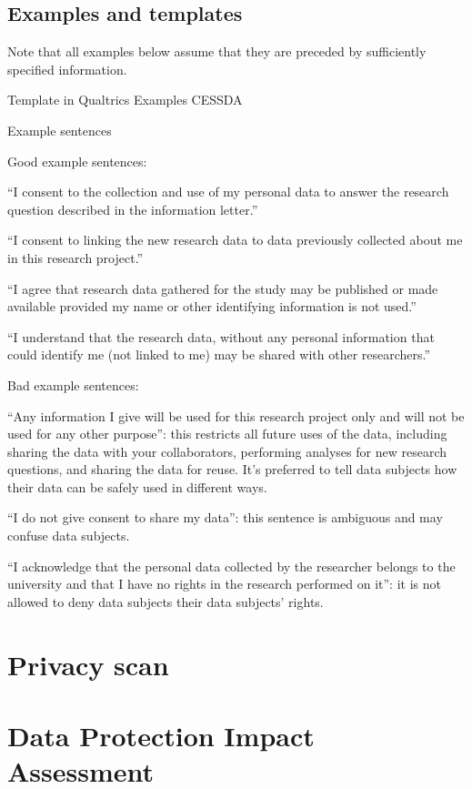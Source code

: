 \documentclass[
]{book}
\begin{document}
\hypertarget{examples-and-templates}{%
\subsection{Examples and templates}\label{examples-and-templates}}

Note that all examples below assume that they are preceded by
sufficiently specified information.

Template in Qualtrics
Examples CESSDA

Example sentences

Good example sentences:

``I consent to the collection and use of my personal data to answer the
research question described in the information letter.''

``I consent to linking the new research data to data previously collected
about me in this research project.''

``I agree that research data gathered for the study may be published or
made available provided my name or other identifying information is not used.''

``I understand that the research data, without any personal information
that could identify me (not linked to me) may be shared with other researchers.''

Bad example sentences:

``Any information I give will be used for this research project only and
will not be used for any other purpose'': this restricts all future uses of
the data, including sharing the data with your collaborators, performing
analyses for new research questions, and sharing the data for reuse. It's
preferred to tell data subjects how their data can be safely used in
different ways.

``I do not give consent to share my data'': this sentence is ambiguous and
may confuse data subjects.

``I acknowledge that the personal data collected by the researcher belongs
to the university and that I have no rights in the research performed on it'':
it is not allowed to deny data subjects their data subjects' rights.

\hypertarget{privacy-scan}{%
\section{Privacy scan}\label{privacy-scan}}

\hypertarget{dpia}{%
\section{Data Protection Impact Assessment}\label{dpia}}
\end{document}
